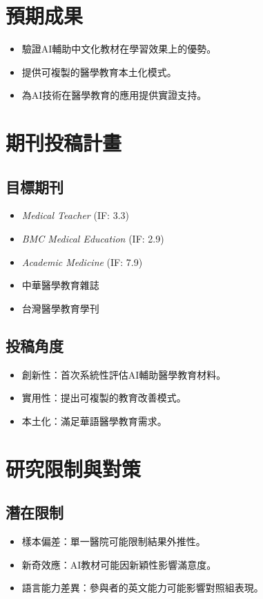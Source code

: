 \documentclass[12pt]{article}
\begin{document}
\section{預期成果}
\begin{itemize}
    \item 驗證AI輔助中文化教材在學習效果上的優勢。
    \item 提供可複製的醫學教育本土化模式。
    \item 為AI技術在醫學教育的應用提供實證支持。
\end{itemize}

\section{期刊投稿計畫}
\subsection{目標期刊}
\begin{itemize}
    \item \textit{Medical Teacher} (IF: 3.3)
    \item \textit{BMC Medical Education} (IF: 2.9)
    \item \textit{Academic Medicine} (IF: 7.9)
    \item 中華醫學教育雜誌
    \item 台灣醫學教育學刊
\end{itemize}

\subsection{投稿角度}
\begin{itemize}
    \item 創新性：首次系統性評估AI輔助醫學教育材料。
    \item 實用性：提出可複製的教育改善模式。
    \item 本土化：滿足華語醫學教育需求。
\end{itemize}

\section{研究限制與對策}
\subsection{潛在限制}
\begin{itemize}
    \item 樣本偏差：單一醫院可能限制結果外推性。
    \item 新奇效應：AI教材可能因新穎性影響滿意度。
    \item 語言能力差異：參與者的英文能力可能影響對照組表現。
\end{itemize}
\end{document}
